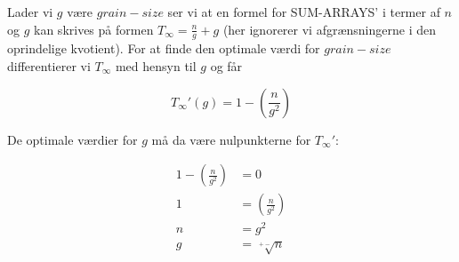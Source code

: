 \documentclass[10pt,a4paper,danish]{article}
\begin{document}
Lader vi $g$ være $grain-size$ ser vi at en formel for SUM-ARRAYS' i termer af $n$ og $g$
kan skrives på formen $T_\infty = \frac{n} {g} + g$ (her ignorerer vi afgrænsningerne i den 
oprindelige kvotient). For at finde den optimale værdi for $grain-size$ differentierer vi
$T_\infty$ med hensyn til $g$ og får

$$T_\infty'(g) = 1 - (\frac{n} {g^2}) $$

De optimale værdier for $g$ må da være nulpunkterne for $T_\infty'$: 

$$
\begin{aligned}
 1 - (\frac{n} {g^2}) &= 0 \\
 1 &=  (\frac{n} {g^2}) \\
 n &= g^2 \\
 g &= \sqrt[+-]{n}
\end{aligned}
$$
 
\end{document}
